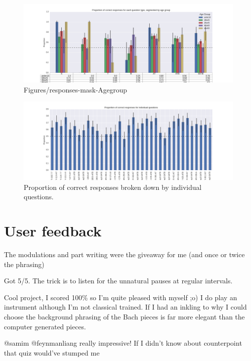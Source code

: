 \documentclass[dissertation.tex]{subfiles}
\begin{document}
\begin{figure}[htpb]
  \centering
  \includegraphics[width=1.0\linewidth]{Figures/responses-mask-agegroup.png}
  \caption{Figures/responses-mask-Agegroup}
  \label{fig:responses-mask-agegroup}
\end{figure}

\begin{figure}[htpb]
  \centering
  \includegraphics[width=1.0\linewidth]{Figures/responses-name.png}
  \caption{Proportion of correct responses broken down by individual questions.}
  \label{fig:responses-name}
\end{figure}


\section{User feedback}

The modulations and part writing were the giveaway for me (and once or twice the phrasing)

Got 5/5. The trick is to listen for the unnatural pauses at regular intervals.

Cool project, I scored 100\% so I'm quite pleased with myself ;o) I do
play an instrument although I'm not classical trained. If I had an
inkling to why I could choose the background phrasing of the Bach
pieces is far more elegant than the computer generated pieces.

@samim @feynmanliang really impressive! If I didn't know about counterpoint that quiz would've stumped me



\printbibliography
\end{document}
